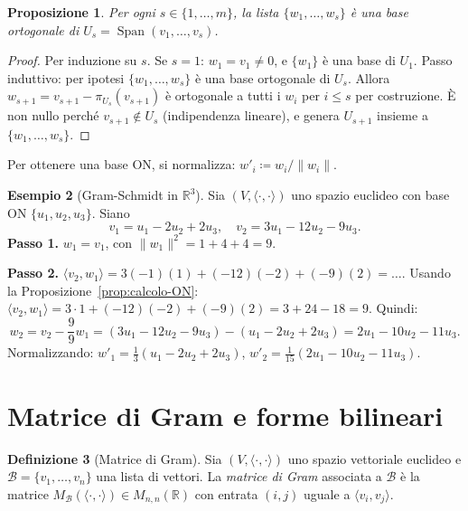 \documentclass[11pt, a4paper]{book}
\theoremstyle{definition}
\newtheorem{definizione}{Definizione}[section]
\newtheorem{esempio}[definizione]{Esempio}
\theoremstyle{plain}
\newtheorem{proposizione}[definizione]{Proposizione}
\theoremstyle{remark}
\newcommand{\R}{\mathbb{R}}
\DeclareMathOperator{\Span}{Span}
\begin{document}
\begin{proposizione}
\label{prop:gram-schmidt}
Per ogni $s \in \{1,\ldots,m\}$, la lista $\{w_1,\ldots,w_s\}$ è una base ortogonale di $U_s = \Span(v_1,\ldots,v_s)$.
\end{proposizione}

\begin{proof}
Per induzione su $s$. Se $s=1$: $w_1 = v_1 \neq 0$, e $\{w_1\}$ è una base di $U_1$. Passo induttivo: per ipotesi $\{w_1,\ldots,w_s\}$ è una base ortogonale di $U_s$. Allora $w_{s+1} = v_{s+1} - \pi_{U_s}(v_{s+1})$ è ortogonale a tutti i $w_i$ per $i \leq s$ per costruzione. È non nullo perché $v_{s+1} \notin U_s$ (indipendenza lineare), e genera $U_{s+1}$ insieme a $\{w_1,\ldots,w_s\}$.
\end{proof}

Per ottenere una base ON, si normalizza: $w'_i \coloneqq w_i/\|w_i\|$.

\begin{exbox}
\begin{esempio}[Gram-Schmidt in $\R^3$]
Sia $(V,\langle\cdot,\cdot\rangle)$ uno spazio euclideo con base ON $\{u_1,u_2,u_3\}$. Siano
\[
  v_1 = u_1 - 2u_2 + 2u_3,\quad v_2 = 3u_1 - 12u_2 - 9u_3.
\]
\textbf{Passo 1.} $w_1 = v_1$, con $\|w_1\|^2 = 1+4+4=9$.

\textbf{Passo 2.} $\langle v_2,w_1\rangle = 3(-1)(1)+(-12)(-2)+(-9)(2) = \ldots$. Usando la Proposizione~\ref{prop:calcolo-ON}: $\langle v_2,w_1\rangle = 3\cdot1 + (-12)(-2) + (-9)(2) = 3+24-18 = 9$. Quindi:
\[
  w_2 = v_2 - \frac{9}{9}w_1 = (3u_1-12u_2-9u_3)-(u_1-2u_2+2u_3) = 2u_1-10u_2-11u_3.
\]
Normalizzando: $w'_1 = \frac{1}{3}(u_1-2u_2+2u_3)$, $w'_2 = \frac{1}{15}(2u_1-10u_2-11u_3)$.
\end{esempio}
\end{exbox}

\section{Matrice di Gram e forme bilineari}
\label{sec:gram}

\begin{defbox}
\begin{definizione}[Matrice di Gram]
\label{def:gram}
Sia $(V,\langle\cdot,\cdot\rangle)$ uno spazio vettoriale euclideo e $\mathcal{B} = \{v_1,\ldots,v_n\}$ una lista di vettori. La \emph{matrice di Gram} associata a $\mathcal{B}$ è la matrice $M_{\mathcal{B}}(\langle\cdot,\cdot\rangle) \in M_{n,n}(\R)$ con entrata $(i,j)$ uguale a $\langle v_i,v_j\rangle$.
\end{definizione}
\end{defbox}
\end{document}
